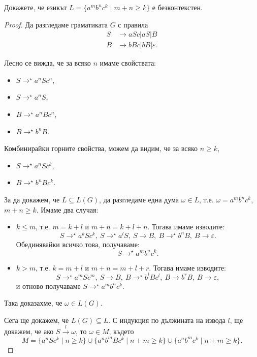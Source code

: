 \begin{problem}
  Докажете, че езикът $L = \{a^mb^nc^k\mid m+n \geq k\}$ е безконтекстен.
\end{problem}
\begin{proof}
  Да разгледаме граматиката $G$ с правила
  \begin{align*}
    S& \rightarrow aSc\vert aS \vert B\\
    B& \rightarrow bBc\vert bB\vert\varepsilon.
  \end{align*}
  
  Лесно се вижда, че за всяко $n$ имаме свойствата:
  \begin{itemize}
  \item 
    $S \rightarrow^\star a^nSc^n$,
  \item
    $S \rightarrow^\star a^nS$,
  \item
    $B \rightarrow^\star a^nBc^n$,
  \item
    $B \rightarrow^\star b^nB$.
  \end{itemize}
  Комбинирайки горните свойства, можем да видим, че за всяко $n \geq k$,
  \begin{itemize}
  \item 
    $S \rightarrow^\star a^nSc^k$,
  \item
    $B \rightarrow^\star b^nBc^k$.
  \end{itemize}
  За да докажем, че $L \subseteq L(G)$, 
  да разгледаме една дума $\omega \in L$, т.е. $\omega = a^mb^nc^k$, $m+n \geq k$.
  Имаме два случая:
  \begin{itemize}
  \item 
    $k \leq m$, т.е. $m = k+l$ и $m+n = k+l+n$.
    Тогава имаме изводите:
    \[S \rightarrow^\star a^kSc^k,\ S \rightarrow^\star a^lS,\ S \rightarrow B,\ B \rightarrow^\star b^nB,\ B \rightarrow \varepsilon.\]
    Обединявайки всичко това, получаваме:
    \[S \rightarrow^\star a^mb^nc^k.\]
  \item
    $k > m$, т.е. $k = m+l$ и $m+n = m+l+r$.
    Тогава имаме изводите:
    \[S \rightarrow^\star a^mSc^m,\ S\rightarrow B,\ B\rightarrow^\star b^lBc^l,\ B\rightarrow b^rB,\ B\rightarrow\varepsilon,\]
    и отново получаваме $S \rightarrow^\star a^mb^nc^k$.
  \end{itemize}
  Така доказахме, че $\omega \in L(G)$.
  
  Сега ще докажем, че $L(G) \subseteq L$.
  С индукция по дължината на извода $l$,
  ще докажем, че ако $S \stackrel{l}{\rightarrow}\omega$, то $\omega \in M$, където
  \[M = \{a^nSc^k\mid n\geq k\}\cup\{a^nb^mBc^k\mid n+m\geq k\}\cup\{a^nb^mc^k\mid n+m\geq k\}.\]
  

\end{proof}
